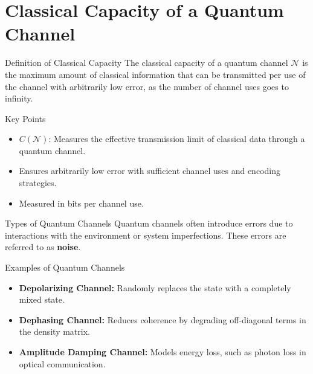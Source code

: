 \section{Classical Capacity of a Quantum Channel}

\begin{frame}{Definition of Classical Capacity}
    The classical capacity of a quantum channel \( \mathcal{N} \) is the maximum amount of classical information that can be transmitted per use of the channel with arbitrarily low error, as the number of channel uses goes to infinity.

    \begin{block}{Key Points}
        \begin{itemize}
            \item \( C(\mathcal{N}) \): Measures the effective transmission limit of classical data through a quantum channel.
            \item Ensures arbitrarily low error with sufficient channel uses and encoding strategies.
            \item Measured in bits per channel use.
        \end{itemize}
    \end{block}
\end{frame}


\begin{frame}{Types of Quantum Channels}
    Quantum channels often introduce errors due to interactions with the environment or system imperfections. These errors are referred to as \textbf{noise}.

    \begin{block}{Examples of Quantum Channels}
        \begin{itemize}
            \item \textbf{Depolarizing Channel:} Randomly replaces the state with a completely mixed state.
            \item \textbf{Dephasing Channel:} Reduces coherence by degrading off-diagonal terms in the density matrix.
            \item \textbf{Amplitude Damping Channel:} Models energy loss, such as photon loss in optical communication.
        \end{itemize}
    \end{block}
\end{frame}


